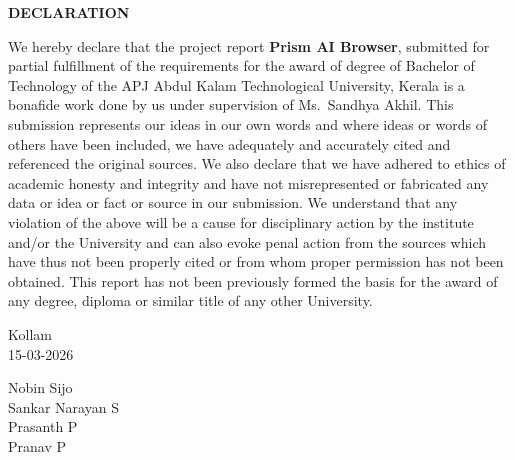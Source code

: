 \thispagestyle{frontmatter}

\begin{center}
    {\LARGE \textbf{DECLARATION}}
\end{center}

\vspace{0.6cm}

\hspace{0.5cm} We hereby declare that the project report \textbf{Prism AI Browser}, submitted for
partial fulfillment of the requirements for the award of degree of Bachelor of Technology
of the APJ Abdul Kalam Technological University, Kerala is a bonafide work done by us
under supervision of Ms.\ Sandhya Akhil.
This submission represents our ideas in our own words and where ideas or words of
others have been included, we have adequately and accurately cited and referenced the
original sources. We also declare that we have adhered to ethics of academic honesty and
integrity and have not misrepresented or fabricated any data or idea or fact or source in
our submission. We understand that any violation of the above will be a cause for
disciplinary action by the institute and/or the University and can also evoke penal action
from the sources which have thus not been properly cited or from whom proper permission
has not been obtained. This report has not been previously formed the basis for the award
of any degree, diploma or similar title of any other University.\\[3.5cm]

\noindent
\begin{minipage}[t]{0.45\textwidth}
    Kollam\\[0.1cm]
    15-03-2026
\end{minipage}
\hfill
\begin{minipage}[t]{0.45\textwidth}
    \raggedleft
    Nobin Sijo\\[0.2cm]
    Sankar Narayan S\\[0.2cm]
    Prasanth P\\[0.2cm]
    Pranav P
\end{minipage}
